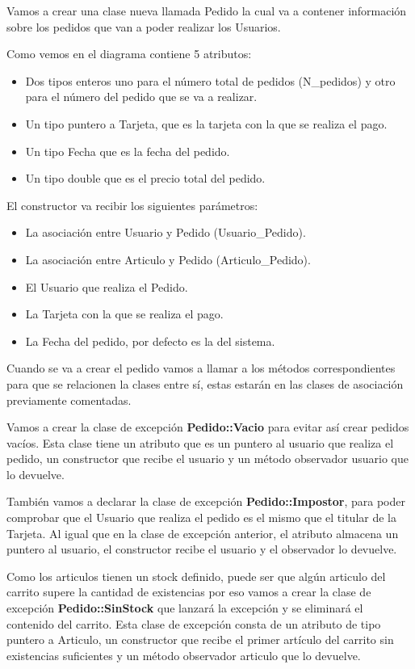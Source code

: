 Vamos a crear una clase nueva llamada Pedido la cual va a contener información sobre los pedidos que van a poder realizar los Usuarios.

Como vemos en el diagrama contiene 5 atributos:
\begin{itemize}
  \item Dos tipos enteros uno para el número total de pedidos (N\_pedidos) y otro para el número del pedido que se va a realizar.
  \item Un tipo puntero a Tarjeta, que es la tarjeta con la que se realiza el pago.
  \item Un tipo Fecha que es la fecha del pedido.
  \item Un tipo double que es el precio total del pedido.
\end{itemize}

El constructor va recibir los siguientes parámetros:
\begin{itemize}
  \item La asociación entre Usuario y Pedido (Usuario\_Pedido).
  \item La asociación entre Articulo y Pedido (Articulo\_Pedido).
  \item El Usuario que realiza el Pedido.
  \item La Tarjeta con la que se realiza el pago.
  \item La Fecha del pedido, por defecto es la del sistema.
\end{itemize}

Cuando se va a crear el pedido vamos a llamar a los métodos correspondientes para que se relacionen la clases entre sí, estas estarán en las clases de asociación previamente comentadas.

Vamos a crear la clase de excepción \textbf{Pedido::Vacio} para evitar así crear pedidos vacíos. Esta clase tiene un atributo que es un puntero al usuario que realiza el pedido, un constructor que recibe el usuario y un método observador usuario que lo devuelve.

También vamos a declarar la clase de excepción \textbf{Pedido::Impostor}, para poder comprobar que el Usuario que realiza el pedido es el mismo que el titular de la Tarjeta. Al igual que en la clase de excepción anterior, el atributo almacena un puntero al usuario, el constructor recibe el usuario y el observador lo devuelve.

Como los articulos tienen un stock definido, puede ser que algún articulo del carrito supere la cantidad de existencias por eso vamos a crear la clase de excepción \textbf{Pedido::SinStock} que lanzará la excepción y se eliminará el contenido del carrito. Esta clase de excepción consta de un atributo de tipo puntero a Articulo, un constructor que recibe el primer artículo del carrito sin existencias suficientes y un método observador articulo que lo devuelve.


